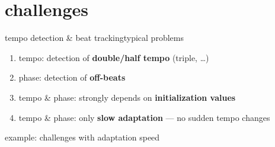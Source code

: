     \section{challenges}
        \begin{frame}{tempo detection \& beat tracking}{typical problems}
            \begin{enumerate}
                \item	tempo: detection of \textbf{double/half tempo} (triple, \ldots)
                \smallskip
                \item<1->	phase: detection of \textbf{off-beats}
                \smallskip
                \item<1->	tempo \& phase: strongly depends on \textbf{initialization values}
                \smallskip
                \item<1->	tempo \& phase: only \textbf{slow adaptation} --- no sudden tempo changes
            \end{enumerate}
            
            \bigskip
            example: challenges with adaptation speed\\                      
        \end{frame}
   

